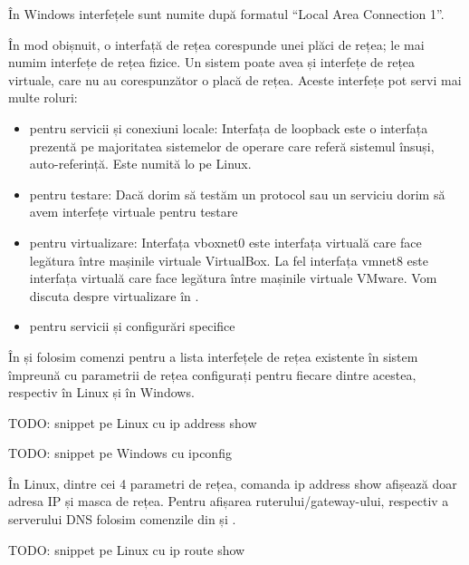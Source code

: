În Windows interfețele sunt numite după formatul “Local Area Connection 1”.

În mod obișnuit, o interfață de rețea corespunde unei plăci de rețea; le mai numim interfețe de rețea fizice. Un sistem poate avea și interfețe de rețea virtuale, care nu au corespunzător o placă de rețea. Aceste interfețe pot servi mai multe roluri:

\begin{itemize}
  \item pentru servicii și conexiuni locale: Interfața de loopback este o interfața prezentă pe majoritatea sistemelor de operare care referă sistemul însuși, auto-referință. Este numită lo pe Linux.
  \item pentru testare: Dacă dorim să testăm un protocol sau un serviciu dorim să avem interfețe virtuale pentru testare
  \item pentru virtualizare: Interfața vboxnet0 este interfața virtuală care face legătura între mașinile virtuale VirtualBox. La fel interfața vmnet8 este interfața virtuală care face legătura între mașinile virtuale VMware. Vom discuta despre virtualizare în .
  \item pentru servicii și configurări specifice
\end{itemize}

În  și  folosim comenzi pentru a lista interfețele de rețea existente în sistem împreună cu parametrii de rețea configurați pentru fiecare dintre acestea, respectiv în Linux și în Windows.

\begin{screen}[caption={Listarea interfețelor de rețea în Linux},label={lst:net:show-if-linux}]
TODO: snippet pe Linux cu ip address show
\end{screen}

\begin{screen}[caption={Listarea interfețelor de rețea în Windows},label={lst:net:show-if-windows}]
TODO: snippet pe Windows cu ipconfig
\end{screen}

În Linux, dintre cei 4 parametri  de rețea, comanda ip address show afișează doar adresa IP și masca de rețea. Pentru afișarea ruterului/gateway-ului, respectiv a serverului DNS folosim comenzile din  și .

\begin{screen}[caption={Afișarea gateway-ului (în Linux)},label={lst:net:show-gateway}]
TODO: snippet pe Linux cu ip route show
\end{screen}


